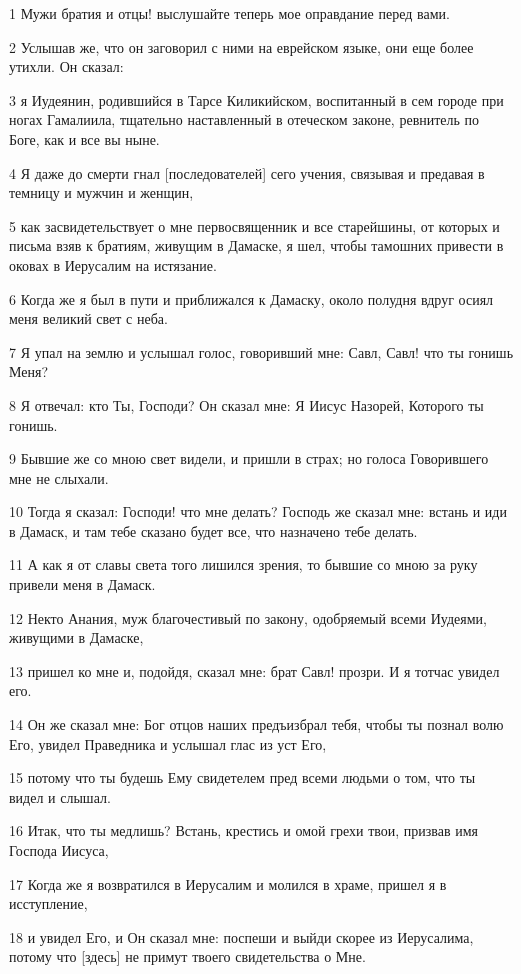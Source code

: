 \par 1 Мужи братия и отцы! выслушайте теперь мое оправдание перед вами.
\par 2 Услышав же, что он заговорил с ними на еврейском языке, они еще более утихли. Он сказал:
\par 3 я Иудеянин, родившийся в Тарсе Киликийском, воспитанный в сем городе при ногах Гамалиила, тщательно наставленный в отеческом законе, ревнитель по Боге, как и все вы ныне.
\par 4 Я даже до смерти гнал [последователей] сего учения, связывая и предавая в темницу и мужчин и женщин,
\par 5 как засвидетельствует о мне первосвященник и все старейшины, от которых и письма взяв к братиям, живущим в Дамаске, я шел, чтобы тамошних привести в оковах в Иерусалим на истязание.
\par 6 Когда же я был в пути и приближался к Дамаску, около полудня вдруг осиял меня великий свет с неба.
\par 7 Я упал на землю и услышал голос, говоривший мне: Савл, Савл! что ты гонишь Меня?
\par 8 Я отвечал: кто Ты, Господи? Он сказал мне: Я Иисус Назорей, Которого ты гонишь.
\par 9 Бывшие же со мною свет видели, и пришли в страх; но голоса Говорившего мне не слыхали.
\par 10 Тогда я сказал: Господи! что мне делать? Господь же сказал мне: встань и иди в Дамаск, и там тебе сказано будет все, что назначено тебе делать.
\par 11 А как я от славы света того лишился зрения, то бывшие со мною за руку привели меня в Дамаск.
\par 12 Некто Анания, муж благочестивый по закону, одобряемый всеми Иудеями, живущими в Дамаске,
\par 13 пришел ко мне и, подойдя, сказал мне: брат Савл! прозри. И я тотчас увидел его.
\par 14 Он же сказал мне: Бог отцов наших предъизбрал тебя, чтобы ты познал волю Его, увидел Праведника и услышал глас из уст Его,
\par 15 потому что ты будешь Ему свидетелем пред всеми людьми о том, что ты видел и слышал.
\par 16 Итак, что ты медлишь? Встань, крестись и омой грехи твои, призвав имя Господа Иисуса,
\par 17 Когда же я возвратился в Иерусалим и молился в храме, пришел я в исступление,
\par 18 и увидел Его, и Он сказал мне: поспеши и выйди скорее из Иерусалима, потому что [здесь] не примут твоего свидетельства о Мне.
